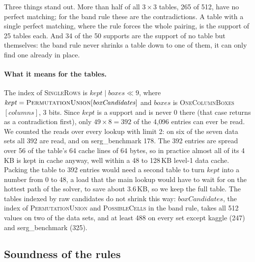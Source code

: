 \documentclass[11pt]{article}
\theoremstyle{definition}
\theoremstyle{plain}
\let\origtextsc\textsc
\renewcommand{\textsc}[1]{\textup{\origtextsc{#1}}}
\begin{document}
\noindent Three things stand out. More than half of all $3\times 3$ tables, 265 of 512, have no perfect matching; for
the band rule these are the contradictions. A table with a single perfect matching, where the rule forces the whole
pairing, is the support of 25 tables each. And 34 of the 50 supports are the support of no table but themselves: the band rule never shrinks a
table down to one of them, it can only find one already in place.

\paragraph{What it means for the tables.} The index of \textsc{SingleRows} is $\mathit{kept}\mid
\mathit{boxes}\ll 9$, where $\mathit{kept}=\textsc{PermutationUnion}[\mathit{boxCandidates}]$ and $\mathit{boxes}$ is
\textsc{OneColumnBoxes}$[\mathit{columns}]$, 3 bits. Since $\mathit{kept}$ is a support and is never 0 there (that case
returns as a contradiction first), only $49\times 8=392$ of the 4{,}096 entries can ever be read. We counted the reads
over every lookup with limit 2: on six of the seven data sets all 392 are read, and on serg\_benchmark 178. The 392
entries are spread over 56 of the table's 64 cache lines of 64 bytes, so in practice almost all of its 4\,KB is kept
in cache anyway, well within a 48 to 128\,KB level-1 data cache. Packing the table to 392 entries would need a second
table to turn $\mathit{kept}$ into a number from 0 to 48, a load that the main lookup would have to wait for on the
hottest path of the solver, to save about 3.6\,KB, so we keep the full table. The tables indexed by raw candidates do
not shrink this way: $\mathit{boxCandidates}$, the index of \textsc{PermutationUnion} and \textsc{PossibleCells} in the
band rule, takes all 512 values on two of the data sets, and at least 488 on every set except kaggle (247) and serg\_benchmark (325).

\subsection{Soundness of the rules}
\end{document}
